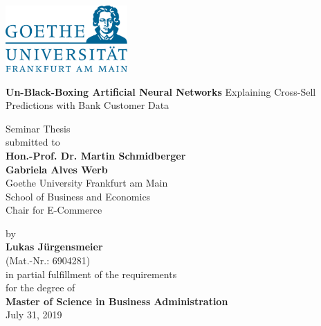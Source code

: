 \documentclass[12pt,a4paper]{article}
\begin{document}
\begin{center}
 \includegraphics[width=0.35\textwidth]{GU-Logo-blau-CMYK.eps} \vspace{2cm}
  
{\Large{\bf Un-Black-Boxing Artificial Neural Networks}} \newline
{\Large{Explaining Cross-Sell Predictions with Bank Customer Data}} \vspace{0.5cm}


  Seminar Thesis \\\vspace{2cm}
  submitted to \\\vspace{0.5cm}
  \textbf{Hon.-Prof. Dr. Martin Schmidberger} \\
  \textbf{Gabriela Alves Werb} \\\vspace{0.5cm}
  Goethe University Frankfurt am Main \\
  School of Business and Economics \\
  Chair for E-Commerce \vspace{2cm}
  
  by \\\vspace{0.5cm}
  \textbf{Lukas J\"urgensmeier} \\
  (Mat.-Nr.: 6904281) \\
  
  \medskip
  \medskip
  in partial fulfillment of the requirements \\
  for the degree of \\\vspace{0.5cm}
  \textbf{Master of Science in Business Administration} \\\vspace{0.5cm}
  July 31, 2019
  
\end{center}
\end{document}
